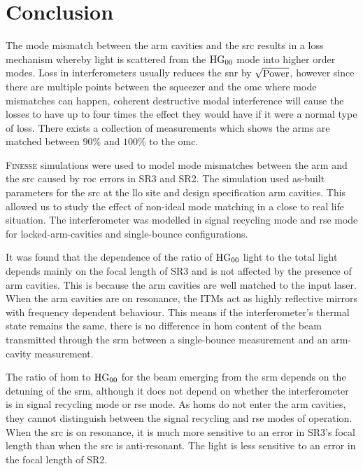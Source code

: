 \section{Conclusion}
\label{sec:beam_parameter_chapter_conclusion}
The mode mismatch between the arm cavities and the \gls{src} results in a loss mechanism whereby light is scattered from the $\rm{HG}_{00}$ mode into higher order modes. Loss in interferometers usually reduces the \gls{snr} by $\sqrt{\rm{Power}}$, however since there are multiple points between the squeezer and the \gls{omc} where mode mismatches can happen, coherent destructive modal interference will cause the losses to have up to four times the effect they would have if it were a normal type of loss. There exists a collection of measurements which shows the arms are matched between $90$\% and $100$\% to the \gls{omc}. 
\par
\textsc{Finesse} simulations were used to model mode mismatches between the arm and the \gls{src} caused by \gls{roc} errors in SR3 and SR2. The simulation used as-built parameters for the \gls{src} at the \gls{llo} site and design specification arm cavities. This allowed us to study the effect of non-ideal mode matching in a close to real life situation. The interferometer was modelled in signal recycling mode and \gls{rse} mode for locked-arm-cavities and single-bounce configurations.
\par
It was found that the dependence of the ratio of $\rm{HG}_{00}$ light to the total light depends mainly on the focal length of SR3 and is not affected by the presence of arm cavities. This is because the arm cavities are well matched to the input laser. When the arm cavities are on resonance, the ITMs act as highly reflective mirrors with frequency dependent behaviour. This means if the interferometer's thermal state remains the same, there is no difference in \gls{hom} content of the beam transmitted through the \gls{srm} between a single-bounce measurement and an arm-cavity measurement. 
\par
The ratio of \gls{hom} to $\rm{HG}_{00}$ for the beam emerging from the \gls{srm} depends on the detuning of the \gls{srm}, although it does not depend on whether the interferometer is in signal recycling mode or \gls{rse} mode. As \glspl{hom} do not enter the arm cavities, they cannot distinguish between the signal recycling and \gls{rse} modes of operation. When the \gls{src} is on resonance, it is much more sensitive to an error in SR3's focal length than when the \gls{src} is anti-resonant. The light is less sensitive to an error in the focal length of SR2. 

